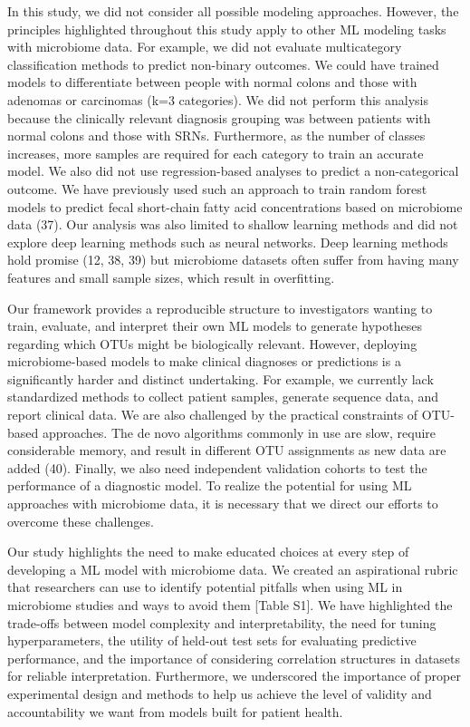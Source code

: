 \documentclass[11pt,]{article}
\begin{document}
In this study, we did not consider all possible modeling approaches.
However, the principles highlighted throughout this study apply to other
ML modeling tasks with microbiome data. For example, we did not evaluate
multicategory classification methods to predict non-binary outcomes. We
could have trained models to differentiate between people with normal
colons and those with adenomas or carcinomas (k=3 categories). We did
not perform this analysis because the clinically relevant diagnosis
grouping was between patients with normal colons and those with SRNs.
Furthermore, as the number of classes increases, more samples are
required for each category to train an accurate model. We also did not
use regression-based analyses to predict a non-categorical outcome. We
have previously used such an approach to train random forest models to
predict fecal short-chain fatty acid concentrations based on microbiome
data (37). Our analysis was also limited to shallow learning methods and
did not explore deep learning methods such as neural networks. Deep
learning methods hold promise (12, 38, 39) but microbiome datasets often
suffer from having many features and small sample sizes, which result in
overfitting.

Our framework provides a reproducible structure to investigators wanting
to train, evaluate, and interpret their own ML models to generate
hypotheses regarding which OTUs might be biologically relevant. However,
deploying microbiome-based models to make clinical diagnoses or
predictions is a significantly harder and distinct undertaking. For
example, we currently lack standardized methods to collect patient
samples, generate sequence data, and report clinical data. We are also
challenged by the practical constraints of OTU-based approaches. The de
novo algorithms commonly in use are slow, require considerable memory,
and result in different OTU assignments as new data are added (40).
Finally, we also need independent validation cohorts to test the
performance of a diagnostic model. To realize the potential for using ML
approaches with microbiome data, it is necessary that we direct our
efforts to overcome these challenges.

Our study highlights the need to make educated choices at every step of
developing a ML model with microbiome data. We created an aspirational
rubric that researchers can use to identify potential pitfalls when
using ML in microbiome studies and ways to avoid them {[}Table S1{]}. We
have highlighted the trade-offs between model complexity and
interpretability, the need for tuning hyperparameters, the utility of
held-out test sets for evaluating predictive performance, and the
importance of considering correlation structures in datasets for
reliable interpretation. Furthermore, we underscored the importance of
proper experimental design and methods to help us achieve the level of
validity and accountability we want from models built for patient
health.
\end{document}
